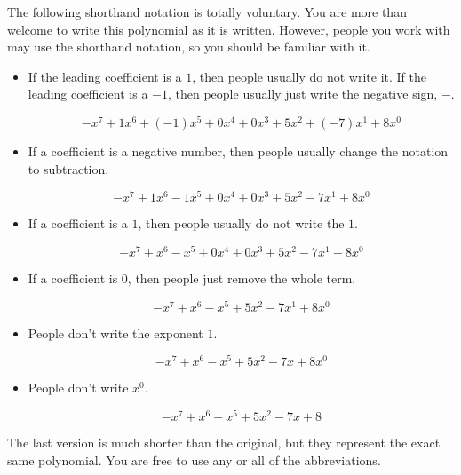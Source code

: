 \documentclass{ximera}
\begin{document}
The following shorthand notation is totally voluntary.  You are more than welcome to write this polynomial as it is written. However, people you work with may use the shorthand notation, so you should be familiar with it.



\begin{itemize}
\item If the leading coefficient is a $1$, then people usually do not write it. If the leading coefficient is a $-1$, then people usually just write the negative sign, $-$.


\[  -x^7 + 1 x^6 + (-1) x^5 + 0 x^4 + 0 x^3 + 5 x^2 + (-7) x^1 + 8 x^0              \]


\item If a coefficient is a negative number, then people usually change the notation to subtraction.


\[  -x^7 + 1 x^6 - 1 x^5 + 0 x^4 + 0 x^3 + 5 x^2 - 7 x^1 + 8 x^0              \]



\item If a coefficient is a $1$, then people usually do not write the $1$.


\[  -x^7 + x^6 - x^5 + 0 x^4 + 0 x^3 + 5 x^2 - 7 x^1 + 8 x^0              \]


\item If a coefficient is $0$, then people just remove the whole term.

\[  -x^7 + x^6 - x^5 + 5 x^2 - 7 x^1 + 8 x^0              \]


\item People don't write the exponent $1$.

\[  -x^7 + x^6 - x^5 + 5 x^2 - 7 x + 8 x^0              \]



\item People don't write $x^0$.

\[  -x^7 + x^6 - x^5 + 5 x^2 - 7 x + 8             \]




\end{itemize}




The last version is much shorter than the original, but they represent the exact same polynomial. You are free to use any or all of the abbreviations.\\
\end{document}
